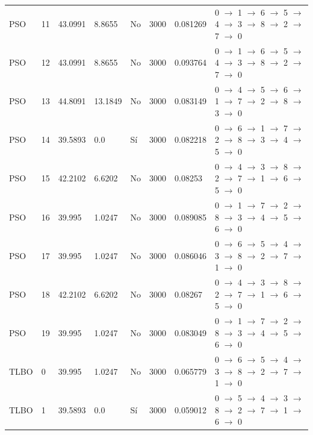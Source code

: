 \begin{table}[htbp]
\begin{tabular}{llllllll}
    PSO & 11 & 43.0991 & 8.8655 & No & 3000 & 0.081269 & 0 $\rightarrow$ 1 $\rightarrow$ 6 $\rightarrow$ 5 $\rightarrow$ 4 $\rightarrow$ 3 $\rightarrow$ 8 $\rightarrow$ 2 $\rightarrow$ 7 $\rightarrow$ 0 \\
    PSO & 12 & 43.0991 & 8.8655 & No & 3000 & 0.093764 & 0 $\rightarrow$ 1 $\rightarrow$ 6 $\rightarrow$ 5 $\rightarrow$ 4 $\rightarrow$ 3 $\rightarrow$ 8 $\rightarrow$ 2 $\rightarrow$ 7 $\rightarrow$ 0 \\
    PSO & 13 & 44.8091 & 13.1849 & No & 3000 & 0.083149 & 0 $\rightarrow$ 4 $\rightarrow$ 5 $\rightarrow$ 6 $\rightarrow$ 1 $\rightarrow$ 7 $\rightarrow$ 2 $\rightarrow$ 8 $\rightarrow$ 3 $\rightarrow$ 0 \\
    PSO & 14 & 39.5893 & 0.0 & Sí & 3000 & 0.082218 & 0 $\rightarrow$ 6 $\rightarrow$ 1 $\rightarrow$ 7 $\rightarrow$ 2 $\rightarrow$ 8 $\rightarrow$ 3 $\rightarrow$ 4 $\rightarrow$ 5 $\rightarrow$ 0 \\
    PSO & 15 & 42.2102 & 6.6202 & No & 3000 & 0.08253 & 0 $\rightarrow$ 4 $\rightarrow$ 3 $\rightarrow$ 8 $\rightarrow$ 2 $\rightarrow$ 7 $\rightarrow$ 1 $\rightarrow$ 6 $\rightarrow$ 5 $\rightarrow$ 0 \\
    PSO & 16 & 39.995 & 1.0247 & No & 3000 & 0.089085 & 0 $\rightarrow$ 1 $\rightarrow$ 7 $\rightarrow$ 2 $\rightarrow$ 8 $\rightarrow$ 3 $\rightarrow$ 4 $\rightarrow$ 5 $\rightarrow$ 6 $\rightarrow$ 0 \\
    PSO & 17 & 39.995 & 1.0247 & No & 3000 & 0.086046 & 0 $\rightarrow$ 6 $\rightarrow$ 5 $\rightarrow$ 4 $\rightarrow$ 3 $\rightarrow$ 8 $\rightarrow$ 2 $\rightarrow$ 7 $\rightarrow$ 1 $\rightarrow$ 0 \\
    PSO & 18 & 42.2102 & 6.6202 & No & 3000 & 0.08267 & 0 $\rightarrow$ 4 $\rightarrow$ 3 $\rightarrow$ 8 $\rightarrow$ 2 $\rightarrow$ 7 $\rightarrow$ 1 $\rightarrow$ 6 $\rightarrow$ 5 $\rightarrow$ 0 \\
    PSO & 19 & 39.995 & 1.0247 & No & 3000 & 0.083049 & 0 $\rightarrow$ 1 $\rightarrow$ 7 $\rightarrow$ 2 $\rightarrow$ 8 $\rightarrow$ 3 $\rightarrow$ 4 $\rightarrow$ 5 $\rightarrow$ 6 $\rightarrow$ 0 \\
    TLBO & 0 & 39.995 & 1.0247 & No & 3000 & 0.065779 & 0 $\rightarrow$ 6 $\rightarrow$ 5 $\rightarrow$ 4 $\rightarrow$ 3 $\rightarrow$ 8 $\rightarrow$ 2 $\rightarrow$ 7 $\rightarrow$ 1 $\rightarrow$ 0 \\
    TLBO & 1 & 39.5893 & 0.0 & Sí & 3000 & 0.059012 & 0 $\rightarrow$ 5 $\rightarrow$ 4 $\rightarrow$ 3 $\rightarrow$ 8 $\rightarrow$ 2 $\rightarrow$ 7 $\rightarrow$ 1 $\rightarrow$ 6 $\rightarrow$ 0 \\

\end{tabular}
\end{table}
